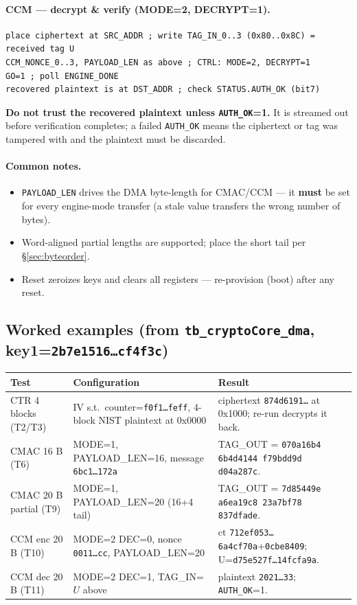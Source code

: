 \documentclass[11pt,a4paper]{article}
\newcommand{\bit}[1]{\texttt{#1}}
\begin{document}
\paragraph{CCM --- decrypt \& verify (MODE=2, DECRYPT=1).}
\begin{lstlisting}
place ciphertext at SRC_ADDR ; write TAG_IN_0..3 (0x80..0x8C) = received tag U
CCM_NONCE_0..3, PAYLOAD_LEN as above ; CTRL: MODE=2, DECRYPT=1
GO=1 ; poll ENGINE_DONE
recovered plaintext is at DST_ADDR ; check STATUS.AUTH_OK (bit7)
\end{lstlisting}
\textbf{Do not trust the recovered plaintext unless \bit{AUTH\_OK}=1.} It is streamed out
before verification completes; a failed \bit{AUTH\_OK} means the ciphertext or tag was
tampered with and the plaintext must be discarded.

\paragraph{Common notes.}
\begin{itemize}[nosep]
  \item \bit{PAYLOAD\_LEN} drives the DMA byte-length for CMAC/CCM --- it \textbf{must} be set
        for every engine-mode transfer (a stale value transfers the wrong number of bytes).
  \item Word-aligned partial lengths are supported; place the short tail per \S\ref{sec:byteorder}.
  \item Reset zeroizes keys and clears all registers --- re-provision (boot) after any reset.
\end{itemize}

\subsection{Worked examples (from \texttt{tb\_cryptoCore\_dma}, key1=\texttt{2b7e1516\dots cf4f3c})}
\begin{longtable}{@{}p{} p{} p{}@{}}
\hline
\textbf{Test} & \textbf{Configuration} & \textbf{Result} \\ \hline \endhead
CTR 4 blocks (T2/T3) & IV s.t.\ counter=\texttt{f0f1\dots feff}, 4-block NIST plaintext at 0x0000 &
  ciphertext \texttt{874d6191\dots} at 0x1000; re-run decrypts it back. \\ \hline
CMAC 16 B (T6) & MODE=1, PAYLOAD\_LEN=16, message \texttt{6bc1\dots172a} &
  TAG\_OUT = \texttt{070a16b4\,6b4d4144\,f79bdd9d\,d04a287c}. \\ \hline
CMAC 20 B partial (T9) & MODE=1, PAYLOAD\_LEN=20 (16+4 tail) &
  TAG\_OUT = \texttt{7d85449e\,a6ea19c8\,23a7bf78\,837dfade}. \\ \hline
CCM enc 20 B (T10) & MODE=2 DEC=0, nonce \texttt{0011\dots cc}, PAYLOAD\_LEN=20 &
  ct \texttt{712ef053\dots6a4cf70a}+\texttt{0cbe8409}; U=\texttt{d75e527f\dots14fcfa9a}. \\ \hline
CCM dec 20 B (T11) & MODE=2 DEC=1, TAG\_IN=\(U\) above &
  plaintext \texttt{2021\dots33}; \bit{AUTH\_OK}=1. \\ \hline
\end{longtable}
\end{document}
